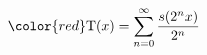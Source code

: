\documentclass[preview]{standalone}
\begin{document}
\begin{align*}
\color{red}\text{T}(x) = \sum_{n=0}^{\infty} \frac{s(2^n x)}{2^n}
\end{align*}
\end{document}
